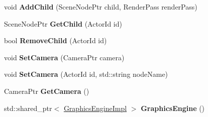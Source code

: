 \begin{DoxyCompactItemize}
void {\bfseries Add\+Child} (Scene\+Node\+Ptr child, Render\+Pass render\+Pass)
\item 
\mbox{\label{classTarbora_1_1Scene_ae982863daedcd9c94c06c6a484883789}} 
Scene\+Node\+Ptr {\bfseries Get\+Child} (Actor\+Id id)
\item 
\mbox{\label{classTarbora_1_1Scene_ad3967c71f11edcc32bc8d2a7d8abbe62}} 
bool {\bfseries Remove\+Child} (Actor\+Id id)
\item 
\mbox{\label{classTarbora_1_1Scene_aaf0eb31b7de572adae21cb39d3f58f02}} 
void {\bfseries Set\+Camera} (Camera\+Ptr camera)
\item 
\mbox{\label{classTarbora_1_1Scene_a80c14fb5ac52c7894c24ccfe87bd114d}} 
void {\bfseries Set\+Camera} (Actor\+Id id, std\+::string node\+Name)
\item 
\mbox{\label{classTarbora_1_1Scene_aa7056e693fa0d3407401ae8555d42165}} 
Camera\+Ptr {\bfseries Get\+Camera} ()
\item 
\mbox{\label{classTarbora_1_1Scene_aa21aac20c7f614f7b871a85d3b33b80d}} 
std\+::shared\+\_\+ptr$<$ \hyperlink{classTarbora_1_1GraphicsEngineImpl}{Graphics\+Engine\+Impl} $>$ {\bfseries Graphics\+Engine} ()
\end{DoxyCompactItemize}
